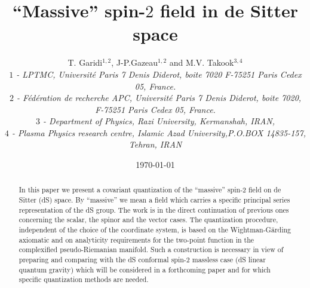 \documentclass[a4paper,11pt,showpacs,preprintnumbers]{revtex4}
\begin{document}

\title{``Massive'' spin-$2$ field in de Sitter space}

\author{
T. Garidi$^{1,2}$, J-P.Gazeau$^{1,2}$ and M.V. Takook$^{3,4}$\\
{\it $1$ - LPTMC, Universit\'e Paris 7  Denis Diderot, boite 7020
F-75251 Paris Cedex 05, France.\\
$2$ - F\'ed\'eration de recherche APC, Universit\'e Paris 7
Denis Diderot, boite 7020, \\F-75251 Paris Cedex 05, France.\\
$3$ - Department of Physics, Razi University, Kermanshah, IRAN,\\
$4$ - Plasma Physics research centre, Islamic Azad
University,P.O.BOX 14835-157, Tehran, IRAN }}

\date{\today}%

\begin{abstract}

In this paper we present a covariant quantization of the
``massive'' spin-$2$ field on de Sitter (dS) space. By ``massive''
we mean a field which carries a specific principal series
representation of the dS group. The work is in the direct
continuation of previous ones concerning the scalar, the spinor
and the vector cases. The quantization procedure,  independent of
the choice of the coordinate system, is based on the
Wightman-G\"arding axiomatic and on analyticity requirements for
the two-point function in the complexified pseudo-Riemanian
manifold. Such a construction is necessary in view of preparing
and comparing with the dS conformal spin-$2$ massless case (dS
linear quantum gravity) which will be considered in a forthcoming
paper and for which specific quantization methods are needed.
\end{abstract}


\maketitle\newpage

\end{document}
